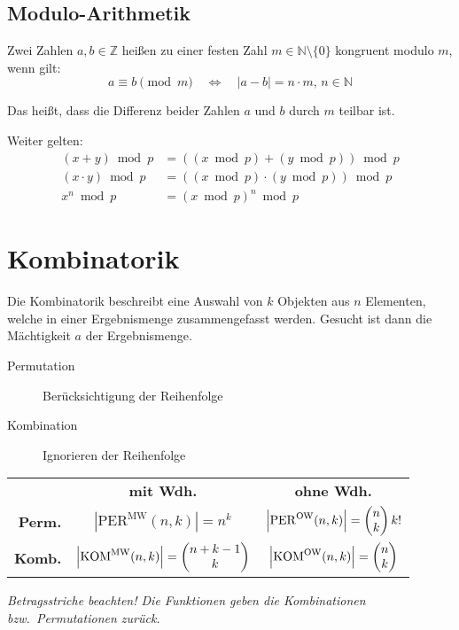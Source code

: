 

\section{Modulo-Arithmetik}

Zwei Zahlen $a,b\in\mathbb{Z}$ heißen zu einer festen Zahl $m\in\mathbb{N}\setminus\{0\}$ kongruent modulo $m$, wenn gilt:
\[ a\equiv b \pmod m \quad \iff \quad \lvert a-b \rvert = n\cdot m,\,n\in\mathbb{N} \]

Das heißt, dass die Differenz beider Zahlen $a$ und $b$ durch $m$ teilbar ist.

Weiter gelten:
\begin{align*}
  (x +     y) \bmod p & =((x\bmod p)+(y\bmod p)) \bmod p \\
  (x \cdot y) \bmod p & =((x\bmod p)\cdot(y\bmod p))\bmod p\\
  x^n \bmod p         & = (x\bmod p)^n \bmod p
\end{align*}



\chapter{\label{chap:Kombinatorik}Kombinatorik}

Die Kombinatorik beschreibt eine Auswahl von $k$ Objekten aus $n$ Elementen, welche in einer Ergebnismenge zusammengefasst werden.
Gesucht ist dann die Mächtigkeit $a$ der Ergebnismenge.

\begin{description}
  \item [Permutation] 
	Berücksichtigung der Reihenfolge
  \item [Kombination] 
	Ignorieren der Reihenfolge
\end{description}

\noindent\begin{center}
\begin{tabular}{rcc}
              & \bfseries mit Wdh.
              & \bfseries ohne Wdh. \\
  \bfseries Perm.
              & $\left|\mathrm{PER}^{\mathrm{MW}}(n,k)\right| = n^k$
              & $\left|\mathrm{PER}^{\mathrm{OW}}(n,k)\right| = \vecc(n;k) k!$ \\[1.6667em]
  \bfseries Komb.
              & $\left|\mathrm{KOM}^{\mathrm{MW}}(n,k)\right| = \vecc(n+k-1;k)$
              & $\left|\mathrm{KOM}^{\mathrm{OW}}(n,k)\right| = \vecc(n;k)$
\end{tabular}

\vspace{0.66667em}
\emph{Betragsstriche beachten! Die Funktionen geben die Kombinationen bzw.~Permutationen zurück.}
\end{center}

